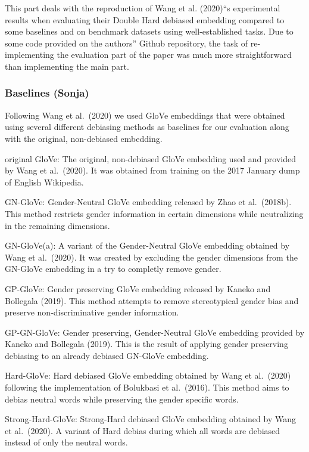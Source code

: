 \documentclass[
  english,
  man,floatsintext]{apa6}
\begin{document}
This part deals with the reproduction of Wang et al. (2020)\enquote{s experimental results when evaluating their Double Hard debiased embedding compared to some baselines and on benchmark datasets using well-established tasks. Due to some code provided on the authors} Github repository, the task of re-implementing the evaluation part of the paper was much more straightforward than implementing the main part.

\hypertarget{baselines-sonja}{%
\subsubsection{Baselines (Sonja)}\label{baselines-sonja}}

Following Wang et al.~(2020) we used GloVe embeddings that were obtained using several different debiasing methods as baselines for our evaluation along with the original, non-debiased embedding.

original GloVe: The original, non-debiased GloVe embedding used and provided by Wang et al.~(2020). It was obtained from training on the 2017 January dump of English Wikipedia.

GN-GloVe: Gender-Neutral GloVe embedding released by Zhao et al.~(2018b). This method restricts gender information in certain dimensions while neutralizing in the remaining dimensions.

GN-GloVe(a): A variant of the Gender-Neutral GloVe embedding obtained by Wang et al.~(2020). It was created by excluding the gender dimensions from the GN-GloVe embedding in a try to completly remove gender.

GP-GloVe: Gender preserving GloVe embedding released by Kaneko and Bollegala (2019). This method attempts to remove stereotypical gender bias and preserve non-discriminative gender information.

GP-GN-GloVe: Gender preserving, Gender-Neutral GloVe embedding provided by Kaneko and Bollegala (2019). This is the result of applying gender preserving debiasing to an already debiased GN-GloVe embedding.

Hard-GloVe: Hard debiased GloVe embedding obtained by Wang et al.~(2020) following the implementation of Bolukbasi et al.~(2016). This method aims to debias neutral words while preserving the gender specific words.

Strong-Hard-GloVe: Strong-Hard debiased GloVe embedding obtained by Wang et al.~(2020). A variant of Hard debias during which all words are debiased instead of only the neutral words.
\end{document}
